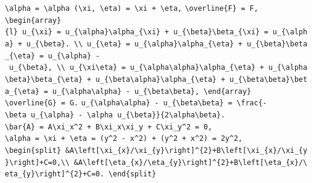 \documentclass[
  ukrainian,
]{article}
\begin{document}
\texttt{\textbackslash{}alpha\ =\ \textbackslash{}alpha\ (\textbackslash{}xi,\ \textbackslash{}eta)\ =\ \textbackslash{}xi\ +\ \textbackslash{}eta,}
\texttt{\textbackslash{}overline\{F\}\ =\ F,}
\texttt{\textbackslash{}begin\{array\}\{l\}\ u\_\{\textbackslash{}xi\}\ =\ u\_\{\textbackslash{}alpha\}\textbackslash{}alpha\_\{\textbackslash{}xi\}\ +\ u\_\{\textbackslash{}beta\}\textbackslash{}beta\_\{\textbackslash{}xi\}\ =\ u\_\{\textbackslash{}alpha\}\ +\ u\_\{\textbackslash{}beta\}.\ \textbackslash{}\textbackslash{}\ u\_\{\textbackslash{}eta\}\ =\ u\_\{\textbackslash{}alpha\}\textbackslash{}alpha\_\{\textbackslash{}eta\}\ +\ u\_\{\textbackslash{}beta\}\textbackslash{}beta\_\{\textbackslash{}eta\}\ =\ u\_\{\textbackslash{}alpha\}\ -\ u\_\{\textbackslash{}beta\},\ \textbackslash{}\textbackslash{}\ u\_\{\textbackslash{}xi\textbackslash{}eta\}\ =\ u\_\{\textbackslash{}alpha\textbackslash{}alpha\}\textbackslash{}alpha\_\{\textbackslash{}eta\}\ +\ u\_\{\textbackslash{}alpha\textbackslash{}beta\}\textbackslash{}beta\_\{\textbackslash{}eta\}\ +\ u\_\{\textbackslash{}beta\textbackslash{}alpha\}\textbackslash{}alpha\_\{\textbackslash{}eta\}\ +\ u\_\{\textbackslash{}beta\textbackslash{}beta\}\textbackslash{}beta\_\{\textbackslash{}eta\}\ =\ u\_\{\textbackslash{}alpha\textbackslash{}alpha\}\ -\ u\_\{\textbackslash{}beta\textbackslash{}beta\},\ \textbackslash{}end\{array\}}
\texttt{\textbackslash{}overline\{G\}\ =\ G.}
\texttt{u\_\{\textbackslash{}alpha\textbackslash{}alpha\}\ -\ u\_\{\textbackslash{}beta\textbackslash{}beta\}\ =\ \textbackslash{}frac\{-\textbackslash{}beta\ u\_\{\textbackslash{}alpha\}\ -\ \textbackslash{}alpha\ u\_\{\textbackslash{}beta\}\}\{2\textbackslash{}alpha\textbackslash{}beta\}.}
\texttt{\textbackslash{}bar\{A\}\ =\ A\textbackslash{}xi\_x\^{}2\ +\ B\textbackslash{}xi\_x\textbackslash{}xi\_y\ +\ C\textbackslash{}xi\_y\^{}2\ =\ 0,}
\texttt{\textbackslash{}alpha\ =\ \textbackslash{}xi\ +\ \textbackslash{}eta\ =\ (y\^{}2\ -\ x\^{}2)\ +\ (y\^{}2\ +\ x\^{}2)\ =\ 2y\^{}2,}
\texttt{\textbackslash{}begin\{split\}\ \&A\textbackslash{}left{[}\textbackslash{}xi\_\{x\}/\textbackslash{}xi\_\{y\}\textbackslash{}right{]}\^{}\{2\}+B\textbackslash{}left{[}\textbackslash{}xi\_\{x\}/\textbackslash{}xi\_\{y\}\textbackslash{}right{]}+C=0,\textbackslash{}\textbackslash{}\ \&A\textbackslash{}left{[}\textbackslash{}eta\_\{x\}/\textbackslash{}eta\_\{y\}\textbackslash{}right{]}\^{}\{2\}+B\textbackslash{}left{[}\textbackslash{}eta\_\{x\}/\textbackslash{}eta\_\{y\}\textbackslash{}right{]}\^{}\{2\}+C=0.\ \textbackslash{}end\{split\}}
\end{document}
